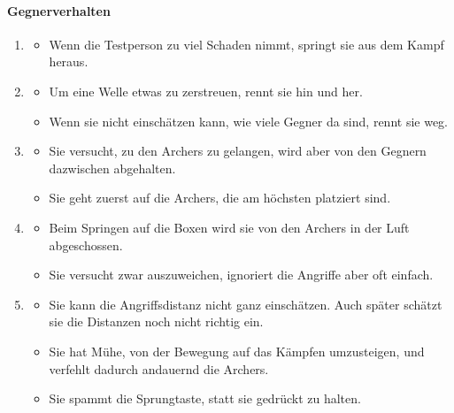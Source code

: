 \documentclass[../Main.tex]{subfiles}
\begin{document}
\paragraph{Gegnerverhalten}
\begin{enumerate}[label=\textbf{B\arabic*}, leftmargin=1.5cm, itemsep=0.8em]
    \item
        \begin{itemize}[nosep]
            \item Wenn die Testperson zu viel Schaden nimmt, springt sie aus dem Kampf heraus.
        \end{itemize}
    \item
        \begin{itemize}[nosep]
            \item Um eine Welle etwas zu zerstreuen, rennt sie hin und her.
            \item Wenn sie nicht einschätzen kann, wie viele Gegner da sind, rennt sie weg.
        \end{itemize}
    \item
        \begin{itemize}[nosep]
            \item Sie versucht, zu den Archers zu gelangen, wird aber von den Gegnern dazwischen abgehalten.
            \item Sie geht zuerst auf die Archers, die am höchsten platziert sind.
        \end{itemize}
    \item
        \begin{itemize}[nosep]
            \item Beim Springen auf die Boxen wird sie von den Archers in der Luft abgeschossen.
            \item Sie versucht zwar auszuweichen, ignoriert die Angriffe aber oft einfach.
        \end{itemize}
    \item
        \begin{itemize}[nosep]
            \item Sie kann die Angriffsdistanz nicht ganz einschätzen. Auch später schätzt sie die Distanzen noch nicht richtig ein.
            \item Sie hat Mühe, von der Bewegung auf das Kämpfen umzusteigen, und verfehlt dadurch andauernd die Archers.
            \item Sie spammt die Sprungtaste, statt sie gedrückt zu halten.
        \end{itemize}
\end{enumerate}
\end{document}
